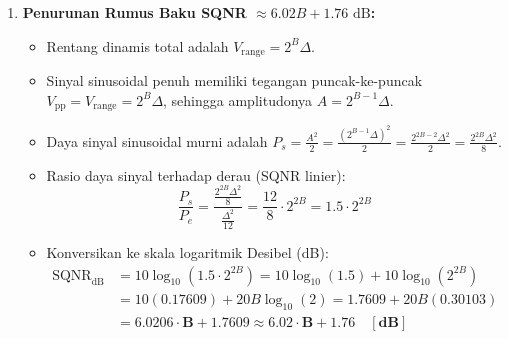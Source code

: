 \documentclass[11pt,a4paper]{article}
\begin{document}
\begin{penurunanbox}[Penurunan Eksak Daya Derau Kuantisasi $\sigma_e^2 = \Delta^2/12$ dan Formula SQNR]
\begin{enumerate}[leftmargin=*]
  \item \textbf{Penurunan Rumus Baku SQNR $\approx 6.02 B + 1.76\text{ dB}$:}
  \begin{itemize}
    \item Rentang dinamis total adalah $V_{\text{range}} = 2^B \Delta$.
    \item Sinyal sinusoidal penuh memiliki tegangan puncak-ke-puncak $V_{\text{pp}} = V_{\text{range}} = 2^B \Delta$, sehingga amplitudonya $A = 2^{B-1}\Delta$.
    \item Daya sinyal sinusoidal murni adalah $P_s = \frac{A^2}{2} = \frac{(2^{B-1}\Delta)^2}{2} = \frac{2^{2B-2}\Delta^2}{2} = \frac{2^{2B}\Delta^2}{8}$.
    \item Rasio daya sinyal terhadap derau (SQNR linier):
    \[
    \frac{P_s}{P_e} = \frac{\frac{2^{2B}\Delta^2}{8}}{\frac{\Delta^2}{12}} = \frac{12}{8} \cdot 2^{2B} = 1.5 \cdot 2^{2B}
    \]
    \item Konversikan ke skala logaritmik Desibel (dB):
    \begin{align}
    \text{SQNR}_{\text{dB}} &= 10 \log_{10}\left( 1.5 \cdot 2^{2B} \right) = 10 \log_{10}(1.5) + 10 \log_{10}\left( 2^{2B} \right) \nonumber \\
    &= 10(0.17609) + 20 B \log_{10}(2) = 1.7609 + 20 B (0.30103) \nonumber \\
    &= \mathbf{6.0206 \cdot B + 1.7609 \approx 6.02 \cdot B + 1.76 \quad [\text{dB}]}
    \end{align}
  \end{itemize}
\end{enumerate}
\end{penurunanbox}
\end{document}
